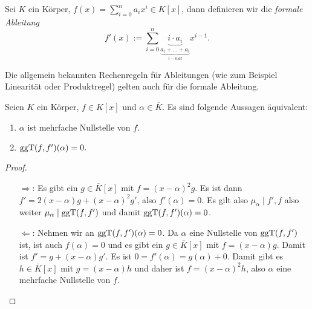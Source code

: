 \begin{definition}
    Sei $K$ ein Körper, $f(x) = \sum_{i=0}^n a_i x^i \in K[x]$, dann definieren wir die \emph{formale Ableitung}
    $$ f'(x) := \sum_{i=0}^n \underbrace{i\cdot a_i}_{\underbrace{a_i + \ldots + a_i}_{i-mal}} x^{i-1}. $$
\end{definition}
\begin{remark}
    Die allgemein bekannten Rechenregeln für Ableitungen (wie zum Beispiel Linearität oder Produktregel) gelten auch für die formale Ableitung.
\end{remark}

\begin{lemma}
    Seien $K$ ein Körper, $f \in K[x]$ und $\alpha \in \overline{K}$. Es sind folgende Aussagen äquivalent:
    \begin{enumerate}
        \item $\alpha$ ist mehrfache Nullstelle von $f$.
        \item $\operatorname{ggT}(f, f')(\alpha) = 0.$
    \end{enumerate}
\end{lemma}
\begin{proof}{\ }
    \begin{enumerate} 
        \item[$\Rightarrow$:] Es gibt ein $g \in \overline{K}[x]$ mit $f = (x-\alpha)^2 g$. Es ist dann $f' = 2(x-\alpha)g + (x-\alpha)^2g'$, also $f'(\alpha) = 0$. Es gilt also $\mu_\alpha \mid f', f$ also weiter $\mu_\alpha \mid \operatorname{ggT}(f, f')$ und damit $\operatorname{ggT}(f, f')(\alpha) = 0$. 
         
        \item[$\Leftarrow$:] Nehmen wir an $\operatorname{ggT}(f, f')(\alpha) = 0$. Da $\alpha$ eine Nullstelle von $\operatorname{ggT}(f, f')$ ist, ist auch $f(\alpha) = 0$ und es gibt ein $g \in \overline{K}[x]$ mit $f = (x-\alpha)g$. Damit ist $f' = g + (x-\alpha)g'$. Es ist $0 = f'(\alpha) = g(\alpha) + 0$. Damit gibt es $h \in \overline{K}[x]$ mit $g = (x-\alpha)h$ und daher ist $f = (x-\alpha)^2h$, also $\alpha$ eine mehrfache Nullstelle von $f$.
    \end{enumerate}
\end{proof}

